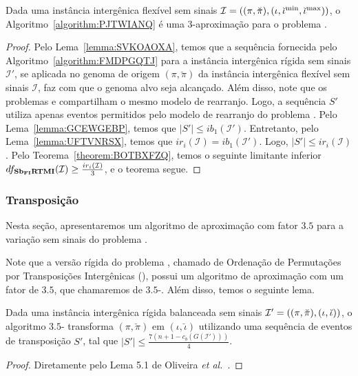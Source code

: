 \begin{theorem}\label{theorem:TYVMEDAI}
Dada uma instância intergênica flexível sem sinais $\mathcal{I} = ((\pi,\breve\pi),(\iota,\breve\iota^{\min},\break\breve\iota^{\max}))$, o Algoritmo~\ref{algorithm:PJTWIANQ} é uma $3$-aproximação para o problema \SbFIRTMI{}.
\end{theorem}
\begin{proof}
Pelo Lema~\ref{lemma:SVKOAOXA}, temos que a sequência fornecida pelo Algoritmo~\ref{algorithm:FMDPGQTJ} para a instância intergênica rígida sem sinais $\mathcal{I'}$, se aplicada no genoma de origem $(\pi,\breve\pi)$ da instância intergênica flexível sem sinais $\mathcal{I}$, faz com que o genoma alvo seja alcançado. Além disso, note que os problemas \SbIRTMI{} e \SbFIRTMI{} compartilham o mesmo modelo de rearranjo. Logo, a sequência $S'$ utiliza apenas eventos permitidos pelo modelo de rearranjo do problema \SbFIRTMI{}. Pelo Lema~\ref{lemma:GCEWGEBP}, temos que $|S'| \le ib_1(\mathcal{I}')$. Entretanto, pelo Lema~\ref{lemma:UFTVNRSX}, temos que $ir_i(\mathcal{I}) = ib_1(\mathcal{I'})$. Logo, $|S'| \le ir_i(\mathcal{I})$. Pelo Teorema~\ref{theorem:BOTBXFZQ}, temos o seguinte limitante inferior $df_{\textbf{Sb\textsubscript{FI}RTMI}}(\mathcal{I}) \ge \frac{ir_i(\mathcal{I})}{3}$, e o teorema segue.
\end{proof}

\subsubsection{Transposição}

Nesta seção, apresentaremos um algoritmo de aproximação com fator $3.5$ para a variação sem sinais do problema \SbFIT{}. 

Note que a versão rígida do problema \SbFIT{}, chamado de Ordenação de Permutações por Transposições Intergênicas (\SbIT), possui um algoritmo de aproximação com um fator de $3.5$, que chamaremos de $3.5$-\SbIT{}. Além disso, temos o seguinte lema.

\begin{lemma}\label{lemma:EIGSYNDP}
Dada uma instância intergênica rígida balanceada sem sinais $\mathcal{I}'=((\pi,\breve\pi),\break(\iota,\breve\iota))$, o algoritmo $3.5$-\SbIT{} transforma $(\pi,\breve\pi)$ em $(\iota,\breve\iota)$ utilizando uma sequência de eventos de transposição $S'$, tal que $|S'| \le \frac{7({n+1} - c_b(G(\mathcal{I}')))}{4}$.
\end{lemma}
\begin{proof}
Diretamente pelo Lema 5.1 de Oliveira \textit{et al.}~\cite{2021a-oliveira-etal}.
\end{proof}

